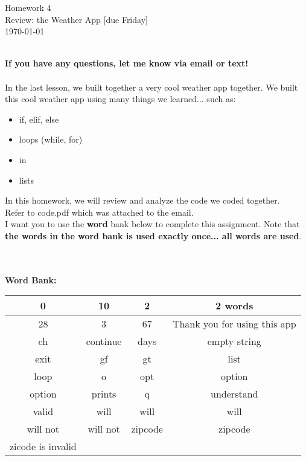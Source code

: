 \documentclass[11pt]{article}
\newcommand{\myhwname}{Homework 4}
\newcommand{\mysection}{Review: the Weather App [due Friday]}
\begin{document}
\begin{center}
    {\Large \myhwname} \\
    \mysection \\
    \today
\end{center}

\noindent\makebox[\linewidth]{\rule{\paperwidth}{0.4pt}}\\
\textbf{If you have any questions, let me know via email or text!}\\\\
In the last lesson, we built together a very cool weather app together. We built this cool weather app using many things we learned... such as:\\
\begin{itemize}
    \item if, elif, else
    \item loops (while, for)
    \item in
    \item lists
\end{itemize}
In this homework, we will review and analyze the code we coded together.\\
Refer to code.pdf which was attached to the email.\\
I want you to use the \textbf{word} bank below to complete this assignment. 
Note that \textbf{the words in the word bank is used exactly once... all words are used}.\\\\
\noindent\makebox[\linewidth]{\rule{\paperwidth}{0.4pt}}\\
\begin{center}
\textbf{Word Bank:}
\begin{tabular}{|c|c|c|c|}
    \hline
    0 & 10 & 2 & 2 words \\
    \hline
    28 & 3 & 67 & Thank you for using this app \\
    \hline
    ch & continue & days & empty string \\
    \hline
    exit & gf & gt & list \\
    \hline
    loop & o & opt & option \\
    \hline
    option & prints & q & understand \\
    \hline
    valid & will & will & will \\
    \hline
    will not & will not & zipcode & zipcode \\
    \hline
    zicode is invalid & & & \\
    \hline
\end{tabular}
\end{center}
\noindent\makebox[\linewidth]{\rule{\paperwidth}{0.4pt}}
\end{document}
